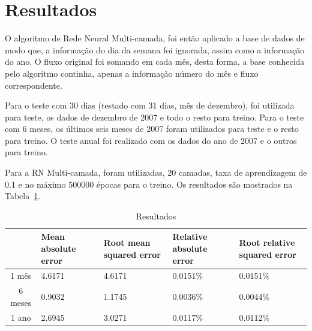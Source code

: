 \documentclass{article}
\begin{document}
\section{Resultados}

O algoritmo de Rede Neural Multi-camada, foi então aplicado a base de dados de modo que,
a informação do dia da semana foi ignorada, assim como a informação do ano. O fluxo
original foi somando em cada mês, desta forma, a base conhecida pelo algoritmo continha,
apenas a informação número do mês e fluxo correspondente.

Para o teste com 30 dias (testado com 31 dias, mês de dezembro), foi utilizada para teste,
os dados de dezembro de 2007 e todo o resto para treino. Para o teste com 6 meses, os últimos
seis meses de 2007 foram utilizados para teste e o resto para treino. O teste anual foi realizado
com os dados do ano de 2007 e o outros para treino.

Para a RN Multi-camada, foram utilizadas, 20 camadas, taxa de aprendizagem de 0.1 e no máximo
500000 épocas para o treino. Os resultados são mostrados na Tabela~\ref{tab:results}.

\begin{table}
   \begin{tabular}{c | p{2.5cm} p{2.5cm} p{3cm} p{2.5cm}}
   \toprule
   &Mean absolute error & Root mean squared error & Relative absolute error & Root relative squared error \\\midrule
   1 mês & 4.6171 & 4.6171 & 0.0151\% & 0.0151\% \\\midrule
   6 meses & 0.9032 & 1.1745 & 0.0036\% & 0.0044\% \\\midrule
   1 ano & 2.6945 & 3.0271 & 0.0117\% & 0.0112\% \\\midrule
   \end{tabular}
   \caption{Resultados}
   \label{tab:results}
\end{table}
\end{document}
